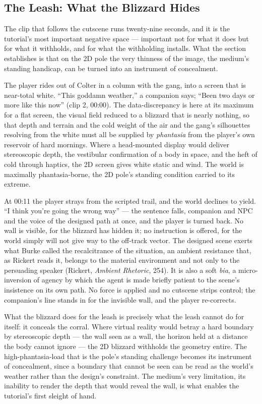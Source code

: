 \documentclass{article}
\begin{document}
\bigskip

\subsection*{The Leash: What the Blizzard Hides}

The clip that follows the cutscene runs twenty-nine seconds, and it is the tutorial's most important negative space — important not for what it does but for what it withholds, and for what the withholding installs. What the section establishes is that on the 2D pole the very thinness of the image, the medium's standing handicap, can be turned into an instrument of concealment.

The player rides out of Colter in a column with the gang, into a screen that is near-total white. ``This goddamn weather,'' a companion says; ``Been two days or more like this now'' (clip 2, 00:00). The data-discrepancy is here at its maximum for a flat screen, the visual field reduced to a blizzard that is nearly nothing, so that depth and terrain and the cold weight of the air and the gang's silhouettes resolving from the white must all be supplied by \textit{phantasia} from the player's own reservoir of hard mornings. Where a head-mounted display would deliver stereoscopic depth, the vestibular confirmation of a body in space, and the heft of cold through haptics, the 2D screen gives white static and wind. The world is maximally phantasia-borne, the 2D pole's standing condition carried to its extreme.

At 00:11 the player strays from the scripted trail, and the world declines to yield. ``I think you're going the wrong way'' — the sentence falls, companion and NPC and the voice of the designed path at once, and the player is turned back. No wall is visible, for the blizzard has hidden it; no instruction is offered, for the world simply will not give way to the off-track vector. The designed scene exerts what Burke called the recalcitrance of the situation, an ambient resistance that, as Rickert reads it, belongs to the material environment and not only to the persuading speaker (Rickert, \textit{Ambient Rhetoric}, 254). It is also a soft \textit{bia}, a micro-inversion of agency by which the agent is made briefly patient to the scene's insistence on its own path. No force is applied and no cutscene strips control; the companion's line stands in for the invisible wall, and the player re-corrects.

What the blizzard does for the leash is precisely what the leash cannot do for itself: it conceals the corral. Where virtual reality would betray a hard boundary by stereoscopic depth — the wall seen as a wall, the horizon held at a distance the body cannot ignore — the 2D blizzard withholds the geometry entire. The high-phantasia-load that is the pole's standing challenge becomes its instrument of concealment, since a boundary that cannot be seen can be read as the world's weather rather than the design's constraint. The medium's very limitation, its inability to render the depth that would reveal the wall, is what enables the tutorial's first sleight of hand.
\end{document}
